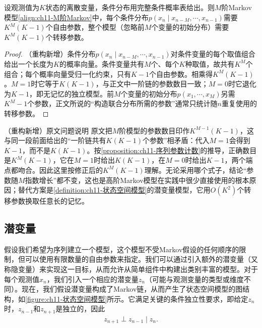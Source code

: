 \documentclass[../../main.tex]{subfiles}
\begin{document}
\begin{proposition}[$M$阶Markov模型的参数计数]\label{proposition:ch11-序列参数计数}
设观测值为$K$状态的离散变量，条件分布用完整条件概率表给出。则$M$阶Markov模型\eqref{align:ch11-M阶Markov}中，每个条件分布$p(x_n\mid x_{n-M},\cdots,x_{n-1})$需要$K^{M}(K-1)$个自由参数，整个模型（忽略前$M$个变量的初始分布）需要$K^{M}(K-1)$个转移参数。
\end{proposition}

\begin{proof}
（重构新增）条件分布$p(x_n\mid x_{n-M},\cdots,x_{n-1})$对条件变量的每个取值组合给出一个长度为$K$的概率向量。条件变量共有$M$个、每个$K$种取值，故共有$K^{M}$个组合；每个概率向量受归一化约束，只有$K-1$个自由参数。相乘得$K^{M}(K-1)$。$M=1$时它等于$K(K-1)$，与正文中一阶链的参数数目一致；$M=0$时它退化为$K-1$，即无记忆的独立模型。前$M$个变量的初始分布$p(x_1,\cdots,x_M)$另需$K^{M}-1$个参数，正文所说的“构造联合分布所需的参数”通常只统计随$n$重复使用的转移参数。
\end{proof}

\begin{remark}（重构新增）原文问题说明
原文把$M$阶模型的参数数目印作$K^{M-1}(K-1)$，这与同一段前面给出的“一阶链共有$K(K-1)$个参数”相矛盾：代入$M=1$会得到$K-1$，而不是$K(K-1)$。按\cref{proposition:ch11-序列参数计数}的推导，正确数目是$K^{M}(K-1)$，它在$M=1$时给出$K(K-1)$，在$M=0$时给出$K-1$，两个端点都吻合。因此这里按修正后的$K^{M}(K-1)$理解。无论采用哪个式子，结论“参数随$M$指数增长”都不变，这也是高阶Markov模型在实践中很少直接使用的根本原因；替代方案是\cref{definition:ch11-状态空间模型}的潜变量模型，它用$O(K^2)$个转移参数换取任意长的记忆。
\end{remark}

\subsection*{潜变量}

假设我们希望为序列建立一个模型，这个模型不受Markov假设的任何顺序的限制，但可以使用有限数量的自由参数来指定。我们可以通过引入额外的潜变量（又称隐变量）来实现这一目标，从而允许从简单组件中构建出类别丰富的模型。对于每个观测值$x_n$，我们引入一个相应的潜变量$z_n$（可能与观测变量的类型或维度不同）。现在，我们假设潜变量构成了Markov链，从而产生了状态空间模型的图结构，如\cref{figure:ch11-状态空间模型}所示。它满足关键的条件独立性要求，即给定$z_n$时，$z_{n-1}$和$z_{n+1}$是独立的，因此
\begin{align}
  z_{n+1} \perp z_{n-1} \mid z_n.
  \label{align:ch11-状态空间条件独立}
\end{align}
\end{document}
